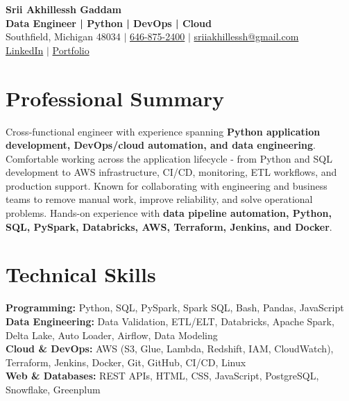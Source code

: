 \documentclass[letterpaper,10pt]{article}
\begin{document}
\fontsize{9.35pt}{10.45pt}\selectfont

\begin{center}
    {\LARGE \textbf{Srii Akhillessh Gaddam}} \\[-1pt]
    \textbf{Data Engineer | Python | DevOps | Cloud} \\[2pt]
    Southfield, Michigan 48034 $|$
    \href{tel:6468752400}{646-875-2400} $|$
    \href{mailto:sriiakhillessh@gmail.com}{sriiakhillessh@gmail.com} \\[1pt]
    \href{https://www.linkedin.com/in/srii-akhiilessh-gaddam-b48668191/}{LinkedIn} $|$
    \href{https://sriiakhillesshg.github.io/portfolio/}{Portfolio}
\end{center}
\vspace{-8pt}

\section{Professional Summary}
\small{Cross-functional engineer with experience spanning \textbf{Python application development, DevOps/cloud automation, and data engineering}. Comfortable working across the application lifecycle - from Python and SQL development to AWS infrastructure, CI/CD, monitoring, ETL workflows, and production support. Known for collaborating with engineering and business teams to remove manual work, improve reliability, and solve operational problems. Hands-on experience with \textbf{data pipeline automation, Python, SQL, PySpark, Databricks, AWS, Terraform, Jenkins, and Docker}.}

\section{Technical Skills}
\small{
\textbf{Programming:} Python, SQL, PySpark, Spark SQL, Bash, Pandas, JavaScript \\
\textbf{Data Engineering:} Data Validation, ETL/ELT, Databricks, Apache Spark, Delta Lake, Auto Loader, Airflow, Data Modeling \\
\textbf{Cloud \& DevOps:} AWS (S3, Glue, Lambda, Redshift, IAM, CloudWatch), Terraform, Jenkins, Docker, Git, GitHub, CI/CD, Linux \\
\textbf{Web \& Databases:} REST APIs, HTML, CSS, JavaScript, PostgreSQL, Snowflake, Greenplum
}

\end{document}
